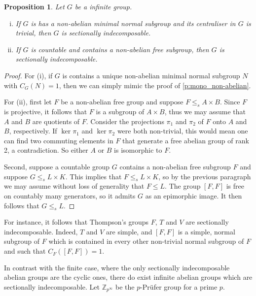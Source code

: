 \documentclass[a4paper,10pt]{amsart}
\theoremstyle{plain}
\newtheorem{proposition}[thm]{Proposition}
\theoremstyle{definition}
\begin{document}
\begin{proposition}
    Let $G$ be a infinite group.
    \begin{enumerate}[(i)]
        \item If $G$ is  has a non-abelian minimal normal subgroup and its centraliser in $G$ is trivial, then $G$ is sectionally indecomposable.
        \item If $G$ is countable and contains a non-abelian free subgroup, then $G$ is sectionally indecomposable.
    \end{enumerate}
\end{proposition}
\begin{proof}
    For (i), if $G$ is contains a unique non-abelian minimal normal subgroup $N$ with $C_G(N)=1$, then we can simply mimic the proof of \cref{p:mono_non-abelian}.

    For (ii), first let $F$ be a non-abelian free group and suppose $F \leq_s A \times B$. Since $F$ is projective, it follows that $F$ is a subgroup of $A \times B$, thus we may assume that $A$ and $B$ are quotients of $F$. Consider the projections $\pi_1$ and $\pi_2$ of $F$ onto $A$ and $B$, respectively. If $\ker \pi_1$ and $\ker \pi_2$ were both non-trivial, this would mean one can find two commuting elements in $F$ that generate a free abelian group of rank 2, a contradiction. So either $A$ or $B$ is isomorphic to $F$.

    Second, suppose a countable group $G$ contains a non-abelian free subgroup $F$ and suppose $G \leq_s L \times K$. This implies that $F \leq_s L \times K$, so by the previous paragraph we may assume without loss of generality that $F \leq L$. The group $[F,F]$ is free on countably many generators, so it admits $G$ as an epimorphic image. It then follows that $G \leq_s L$.
\end{proof}

For instance, it follows that Thompson's groups $F$, $T$ and $V$ are sectionally indecomposable. Indeed, $T$ and $V$ are simple, and $[F,F]$ is a simple, normal subgroup of $F$ which is contained in every other non-trivial normal subgroup of $F$ and such that $C_F([F,F])=1$.

In contrast with the finite case, where the only sectionally indecomposable abelian groups are the cyclic ones, there do exist infinite abelian groups which are sectionally indecomposable. Let $\mathbb Z_{p^\infty}$ be the $p$-Pr{\"u}fer group for a prime $p$.
\end{document}

